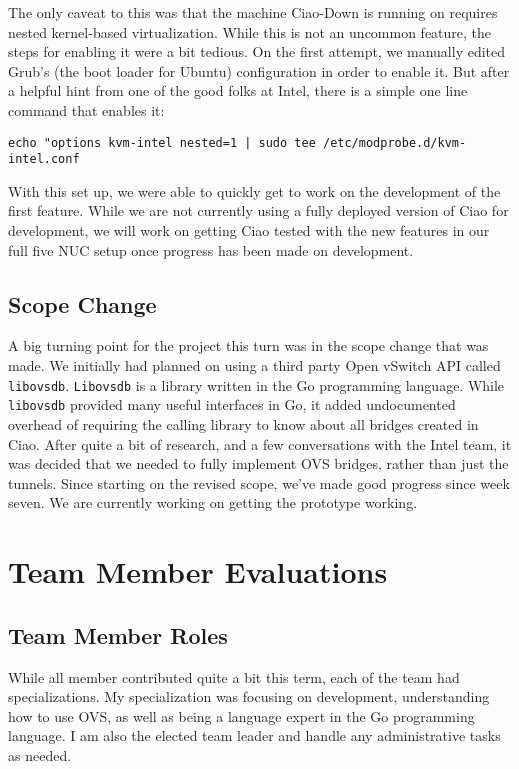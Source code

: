\documentclass[10pt,onecolumn,journal,draftclsnofoot]{IEEEtran}
\begin{document}
The only caveat to this was that the machine Ciao-Down is running on requires
nested kernel-based virtualization. While this is not an uncommon feature, the
steps for enabling it were a bit tedious. On the first attempt, we manually
edited Grub's (the boot loader for Ubuntu) configuration in order to enable it.
But after a helpful hint from one of the good folks at Intel, there is a simple
one line command that enables it:

\begin{lstlisting}[caption = An easy way to enable nested KVM support]
	echo "options kvm-intel nested=1 | sudo tee /etc/modprobe.d/kvm-intel.conf
\end{lstlisting}

With this set up, we were
able to quickly get to work on the development of the first feature. While we
are not currently using a fully deployed version of Ciao for development, we
will work on getting Ciao tested with the new features in our full five NUC
setup once progress has been made on development.

\subsection{Scope Change}
A big turning point for the project this turn was in the scope change that was
made. We initially had planned on using a third party Open vSwitch API called
\texttt{libovsdb}. \texttt{Libovsdb} is a library written in the Go programming
language. While \texttt{libovsdb} provided many useful interfaces in Go, it added
undocumented overhead of requiring the calling library to know about all bridges
created in Ciao. After quite a bit of research, and a few conversations with
the Intel team, it was decided that we needed to fully implement OVS bridges,
rather than just the tunnels. Since starting on the revised scope, we've made
good progress since week seven. We are currently working on getting the prototype
working.

\section{Team Member Evaluations}
\subsection{Team Member Roles}
While all member contributed quite a bit this term, each of the team had
specializations. My specialization was focusing on development, understanding
how to use OVS, as well as being a language expert in the Go programming language. 
I am also the elected team leader and handle any administrative tasks as needed.
\end{document}
